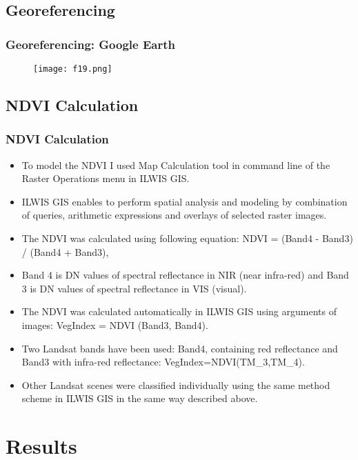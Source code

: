 \documentclass[pdflatex,compress,8pt,
	xcolor={dvipsnames,dvipsnames,svgnames,x11names,table},
	hyperref={colorlinks = true,breaklinks = true, urlcolor = NavyBlue, breaklinks = true}]{beamer}
\begin{document}
\subsection{Georeferencing}
\begin{frame}\frametitle{Georeferencing: Google Earth}
\begin{figure}[H]
	\centering
		\texttt{[image: f19.png]}
\end{figure}
\end{frame}

\subsection{NDVI Calculation}
\begin{frame}\frametitle{NDVI Calculation}
\begin{itemize}
	\item To model the NDVI I used Map Calculation tool in command line of the Raster Operations menu in ILWIS GIS. 
	\item ILWIS GIS enables to perform spatial analysis and modeling by combination of queries, arithmetic expressions and overlays of selected raster images. 
	\item The NDVI was calculated using following equation: NDVI = (Band4 - Band3) / (Band4 + Band3),
	\item Band 4 is DN values of spectral reflectance in NIR (near infra-red) and Band 3 is DN values of spectral reflectance in VIS (visual).
	\item The NDVI was calculated automatically in ILWIS GIS using arguments of images: VegIndex = NDVI (Band3, Band4). 
	\item Two Landsat bands have been used: Band4, containing red reflectance and Band3 with infra-red reflectance: VegIndex=NDVI(TM\_3,TM\_4).
	\item Other Landsat scenes were classified individually using the same method scheme in ILWIS GIS in the same way described above.
\end{itemize}
\end{frame}

\section{Results} 
\end{document}
